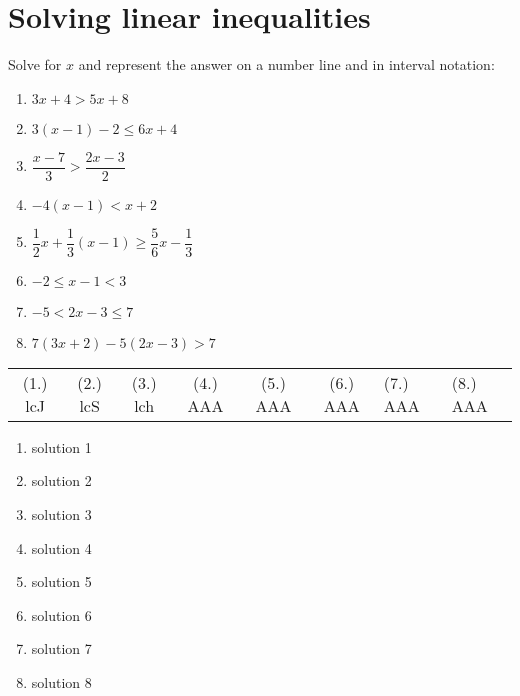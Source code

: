 \section{Solving linear inequalities}
\begin{exercises}{ }
{
Solve for $x$ and represent the answer on a number line and in interval notation:
\begin{enumerate}[itemsep=6pt, label=\textbf{\arabic*}. ] 
    \item $3x+4>5x+8$
    \item $3(x-1)-2\leq 6x+4$ 
    \item $\dfrac{x-7}{3}>\dfrac{2x-3}{2}$
    \item $-4(x-1)<x+2$
    \item $\dfrac{1}{2}x+\dfrac{1}{3}(x-1)\geq \dfrac{5}{6}x-\dfrac{1}{3}$ 
    \item $-2\leq x-1<3$ 
    \item $-5<2x-3\leq7$ 
\item $7(3x+2)-5(2x-3)>7$
    \end{enumerate}
\practiceinfo
\par 
\par \begin{tabular}[h]{cccccc}
(1.) lcJ  &  (2.) lcS  &  (3.) lch  & (4.) AAA & (5.) AAA & (6.) AAA & (7.) AAA & (8.) AAA \end{tabular}
}
\end{exercises}


 \begin{solutions}{}{
\begin{enumerate}[itemsep=5pt, label=\textbf{\arabic*}. ] 


\item solution 1
\item solution 2
\item solution 3
\item solution 4
\item solution 5
\item solution 6
\item solution 7
\item solution 8

\end{enumerate}}
\end{solutions}


